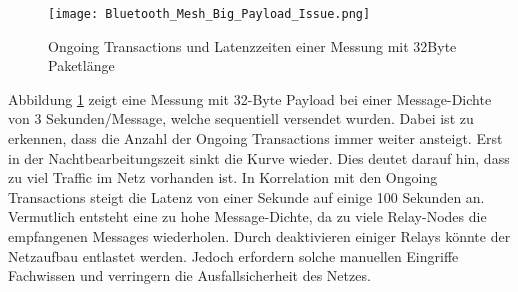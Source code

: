 \begin{figure}[H]
	\centering
	\texttt{[image: Bluetooth\_Mesh\_Big\_Payload\_Issue.png]}
	\caption{Ongoing Transactions und Latenzzeiten einer Messung mit 32Byte Paketlänge}\label{fig:Bluetooth_Mesh_Big_Payload_Issue}
\end{figure}
\vspace{-5mm}
Abbildung \ref{fig:Bluetooth_Mesh_Big_Payload_Issue} zeigt eine Messung mit 32-Byte Payload bei einer Message-Dichte von 3 Sekunden/Message, welche sequentiell versendet wurden.
Dabei ist zu erkennen, dass die Anzahl der Ongoing Transactions immer weiter ansteigt.
Erst in der Nachtbearbeitungszeit sinkt die Kurve wieder.
Dies deutet darauf hin, dass zu viel Traffic im Netz vorhanden ist. In Korrelation mit den Ongoing Transactions steigt die Latenz von einer Sekunde auf einige 100 Sekunden an. Vermutlich entsteht eine zu hohe Message-Dichte, da zu viele Relay-Nodes die empfangenen Messages wiederholen. Durch deaktivieren einiger Relays könnte der Netzaufbau entlastet werden. Jedoch erfordern solche manuellen Eingriffe Fachwissen und verringern die Ausfallsicherheit des Netzes. 